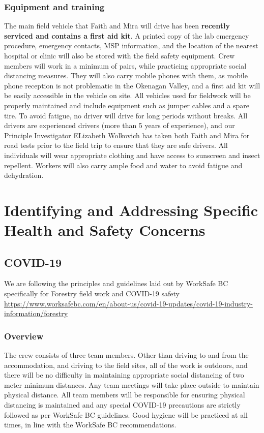 \documentclass[11pt,letter]{article}
\begin{document}
\subsubsection{Equipment and training}
The main field vehicle that Faith and Mira will drive has been  \textbf{recently serviced and contains a first aid kit}. A printed copy of the lab emergency procedure, emergency contacts, MSP information, and the location of the nearest hospital or clinic will also be stored with the field safety equipment. Crew members will work in a minimum of pairs, while practicing appropriate social distancing measures. They will also carry mobile phones with them, as mobile phone reception is not problematic in the Okenagan Valley, and a first aid kit will be easily accessible in the vehicle on site. All vehicles used for fieldwork will be properly maintained and include equipment such as jumper cables and a spare tire. To avoid fatigue, no driver will drive for long periods without breaks. All drivers are experienced drivers (more than 5 years of experience), and our Principle Investigator ELizabeth Wolkovich has taken both Faith and Mira for road tests prior to the field trip to ensure that they are safe drivers. All individuals will wear appropriate clothing and have access to sunscreen and insect repellent. Workers will also carry ample food and water to avoid fatigue and dehydration.  


\section{Identifying and Addressing Specific Health and Safety Concerns}

\subsection{COVID-19}

We are following the principles and guidelines laid out by WorkSafe BC specifically for Forestry field work and COVID-19 safety \url{https://www.worksafebc.com/en/about-us/covid-19-updates/covid-19-industry-information/forestry} 

\subsubsection{Overview}
The crew consists of three team members. Other than driving to and from the accommodation, and driving to the field sites, all of the work is outdoors, and there will be no difficulty in maintaining appropriate social distancing of two meter minimum distances. Any team meetings will take place outside to maintain physical distance. All team members will be responsible for ensuring physical distancing is maintained and any special COVID-19 precautions are strictly followed as per WorkSafe BC guidelines. Good hygiene will be practiced at all times, in line with the  WorkSafe BC recommendations. 
\end{document}
